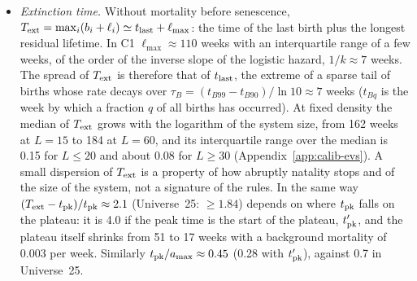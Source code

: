\begin{itemize}
    (1.8 on the founders), and the boom is still one to two generations deep: the mean generation of the births is
    1.42 against 1.35, $R_{\rm net}$ of the first generation is 0.52, and O17p passes in 17 of 20 runs. Pups born
    at $s_{\rm nb}\approx0.4$ ($s_0=0.25$) deepen the boom more at about the same $\Gamma$ (1.3): the mean
    generation is 1.51 and $R_{\rm net}=0.62$ (20 runs per point;
    Appendix~\ref{app:calib-generations}). The depth is set in the first step, from the founders to their offspring:
    pups are born below the deterioration threshold, conception and pup survival scale with the parents' state, and
    pups learn from neighbourhoods made mostly of other pups and of founders that are already deteriorating. In
    Universe~25 the deterioration took the whole phase~C, about 35 weeks, with $T_{\rm gen}\approx10$ weeks, so
    $\Gamma\approx3.5$ (our estimate). With a different operational definition, that is an order-of-magnitude
    comparison, not a test.
  \item \emph{Extinction time.} Without mortality before senescence, $T_{\rm ext}=\max_i(b_i+\ell_i)\simeq
    t_{\rm last}+\ell_{\max}$: the time of the last birth plus the longest residual lifetime. In \textsf{C1}
    $\ell_{\max}\approx110$ weeks with an interquartile range of a few weeks, of the order of the inverse slope of the
    logistic hazard, $1/k\approx7$ weeks. The spread of $T_{\rm ext}$ is therefore that of $t_{\rm last}$, the
    extreme of a sparse tail of births whose rate decays over $\tau_B=(t_{B99}-t_{B90})/\ln10\approx7$ weeks
    ($t_{Bq}$ is the week by which a fraction $q$ of all births has occurred). At fixed density the median of
    $T_{\rm ext}$ grows with the logarithm of the system size, from 162 weeks at $L=15$ to 184 at $L=60$, and its
    interquartile range over the median is 0.15 for $L\le20$ and about 0.08 for $L\ge30$
    (Appendix~\ref{app:calib-evs}). A small dispersion of $T_{\rm ext}$ is a property of how abruptly natality stops
    and of the size of the system, not a signature of the rules. In the same way
    $(T_{\rm ext}-t_{\rm pk})/t_{\rm pk}\approx2.1$ (Universe~25: $\ge1.84$) depends on where $t_{\rm pk}$ falls on the
    plateau: it is 4.0 if the peak time is the start of the plateau, $t'_{\rm pk}$, and the plateau itself shrinks
    from 51 to 17 weeks with a background mortality of 0.003 per week. Similarly $t_{\rm pk}/a_{\max}\approx0.45$
    (0.28 with $t'_{\rm pk}$), against 0.7 in Universe~25.
\end{itemize}

